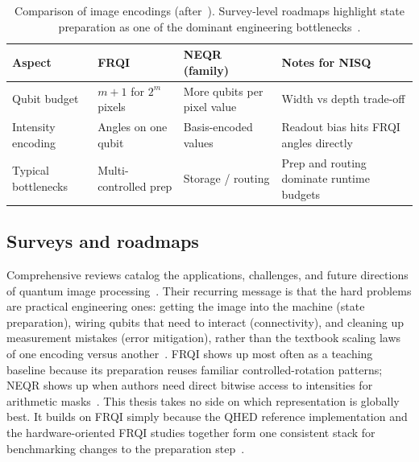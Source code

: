 \begin{table}[htbp]
\centering
\caption{Comparison of image encodings (after~\cite{Le2011FRQI,Zhang2013NEQR,Wang2022ReviewQIP}). Survey-level roadmaps highlight state preparation as one of the dominant engineering bottlenecks~\cite{Farooq2025SystematicReview,Ruan2021OpportunitiesChallenges}.}
\label{tab:repr-compare}
\begin{tabular}{p{2.2cm}p{3.8cm}p{3.8cm}p{3.8cm}}
\toprule
Aspect & FRQI & NEQR (family) & Notes for NISQ \\
\midrule
Qubit budget & $m{+}1$ for $2^m$ pixels & More qubits per pixel value & Width vs depth trade-off \\
Intensity encoding & Angles on one qubit & Basis-encoded values & Readout bias hits FRQI angles directly \\
Typical bottlenecks & Multi-controlled prep & Storage / routing & Prep and routing dominate runtime budgets \\
\bottomrule
\end{tabular}
\end{table}

\subsection{Surveys and roadmaps}
Comprehensive reviews catalog the applications, challenges, and future directions of quantum image processing~\cite{Ruan2021OpportunitiesChallenges,Wang2022ReviewQIP,Farooq2025SystematicReview,EbrahimpourKomleh2024QuantumComputingImageProcessing}. Their recurring message is that the hard problems are practical engineering ones: getting the image into the machine (state preparation), wiring qubits that need to interact (connectivity), and cleaning up measurement mistakes (error mitigation), rather than the textbook scaling laws of one encoding versus another~\cite{Iliyasu2013FRQIroadmap,Geng2023ImprovedFRQI}. FRQI shows up most often as a teaching baseline because its preparation reuses familiar controlled-rotation patterns; NEQR shows up when authors need direct bitwise access to intensities for arithmetic masks~\cite{Zhang2013NEQR}. This thesis takes no side on which representation is globally best. It builds on FRQI simply because the QHED reference implementation and the hardware-oriented FRQI studies together form one consistent stack for benchmarking changes to the preparation step~\cite{Yao2017QHED,Geng2023ImprovedFRQI}.

